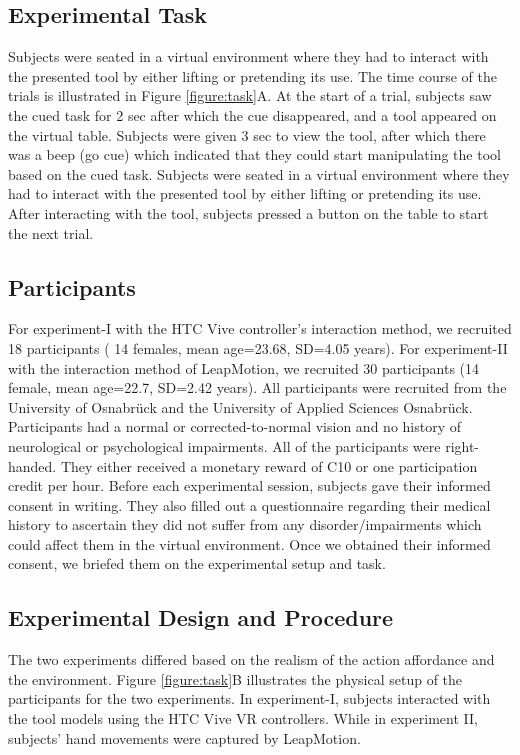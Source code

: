 \subsection{Experimental Task}

Subjects were seated in a virtual environment where they had to interact with the presented tool by either lifting or pretending its use.  The time course of the trials is illustrated in Figure \ref{figure:task}A. At the start of a trial, subjects saw the cued task for 2 sec after which the cue disappeared, and a tool appeared on the virtual table. Subjects were given 3 sec to view the tool, after which there was a beep (go cue) which indicated that they could start manipulating the tool based on the cued task. Subjects were seated in a virtual environment where they had to interact with the presented tool by either lifting or pretending its use. After interacting with the tool, subjects pressed a button on the table to start the next trial.  

\subsection{Participants}

For experiment-I with the HTC Vive controller’s interaction method, we recruited 18 participants ( 14 females, mean age=23.68, SD=4.05 years). For experiment-II with the interaction method of LeapMotion, we recruited 30 participants (14 female, mean age=22.7, SD=2.42 years).  All participants were recruited from the University of Osnabr{\"u}ck and the University of Applied Sciences Osnabr{\"u}ck. Participants had a normal or corrected-to-normal vision and no history of neurological or psychological impairments. All of the participants were right-handed. They either received a monetary reward of C10 or one participation credit per hour. Before each experimental session, subjects gave their informed consent in writing. They also filled out a questionnaire regarding their medical history to ascertain they did not suffer from any disorder/impairments which could affect them in the virtual environment. Once we obtained their informed consent, we briefed them on the experimental setup and task.

\subsection{Experimental Design and Procedure}

The two experiments differed based on the realism of the action affordance and the environment. Figure \ref{figure:task}B illustrates the physical setup of the participants for the two experiments. In experiment-I, subjects interacted with the tool models using the HTC Vive VR controllers. While in experiment II, subjects’ hand movements were captured by LeapMotion. 

